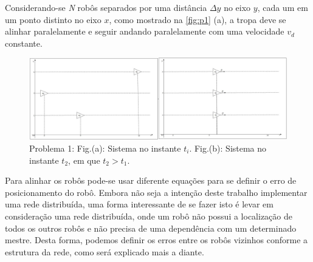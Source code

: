 Considerando-se \emph{N} robôs separados por uma distância $\Delta$$y$ no eixo $y$, cada um em um ponto distinto no eixo $x$, como mostrado na \autoref{fig:p1} (a), a tropa deve se alinhar paralelamente e seguir andando paralelamente com uma velocidade $v_{d}$ constante.

\begin{figure}[!htb]
	\centering
	\includegraphics[width=16cm]{./04-figuras/p1}
	\caption{Problema 1: Fig.(a): Sistema no instante $t_{i}$. Fig.(b): Sistema no instante $t_{2}$, em que $t_{2}$$>$$t_{1}$.}
	\label{fig:p1}
\end{figure}

Para alinhar os robôs pode-se usar diferente equações para se definir o erro de posicionamento do robô. Embora não seja a intenção deste trabalho implementar uma rede distribuída, uma forma interessante de se fazer isto é levar em consideração uma rede distribuída, onde um robô não possui a localização de todos os outros robôs e não precisa de uma dependência com um determinado mestre. Desta forma, podemos definir os erros entre os robôs vizinhos conforme a estrutura da rede, como será explicado mais a diante.

